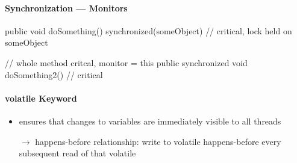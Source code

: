 \paragraph{Synchronization --- Monitors}
\begin{java}
  public void doSomething() {
    synchronized(someObject) {
      // critical, lock held on someObject
    }
  }

  // whole method critcal, monitor = this
  public synchronized void doSomething2() {
    // critical
  }
\end{java}

\paragraph{volatile Keyword}
\begin{itemize}
  \item ensures that changes to variables are immediately visible to all threads
  \item[\( \to \)] happens-before relationship: write to volatile happens-before every subsequent read of that volatile
\end{itemize}

